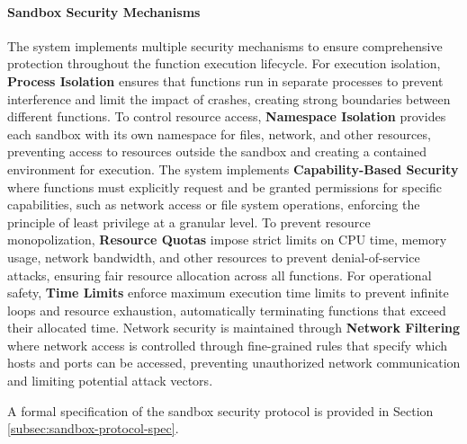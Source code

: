 \documentclass[11pt]{article}
\begin{document}
\paragraph{Sandbox Security Mechanisms}
The system implements multiple security mechanisms to ensure comprehensive protection throughout the function execution lifecycle. For execution isolation, \textbf{Process Isolation} ensures that functions run in separate processes to prevent interference and limit the impact of crashes, creating strong boundaries between different functions. To control resource access, \textbf{Namespace Isolation} provides each sandbox with its own namespace for files, network, and other resources, preventing access to resources outside the sandbox and creating a contained environment for execution. The system implements \textbf{Capability-Based Security} where functions must explicitly request and be granted permissions for specific capabilities, such as network access or file system operations, enforcing the principle of least privilege at a granular level. To prevent resource monopolization, \textbf{Resource Quotas} impose strict limits on CPU time, memory usage, network bandwidth, and other resources to prevent denial-of-service attacks, ensuring fair resource allocation across all functions. For operational safety, \textbf{Time Limits} enforce maximum execution time limits to prevent infinite loops and resource exhaustion, automatically terminating functions that exceed their allocated time. Network security is maintained through \textbf{Network Filtering} where network access is controlled through fine-grained rules that specify which hosts and ports can be accessed, preventing unauthorized network communication and limiting potential attack vectors.

A formal specification of the sandbox security protocol is provided in Section \ref{subsec:sandbox-protocol-spec}.


\end{document}
